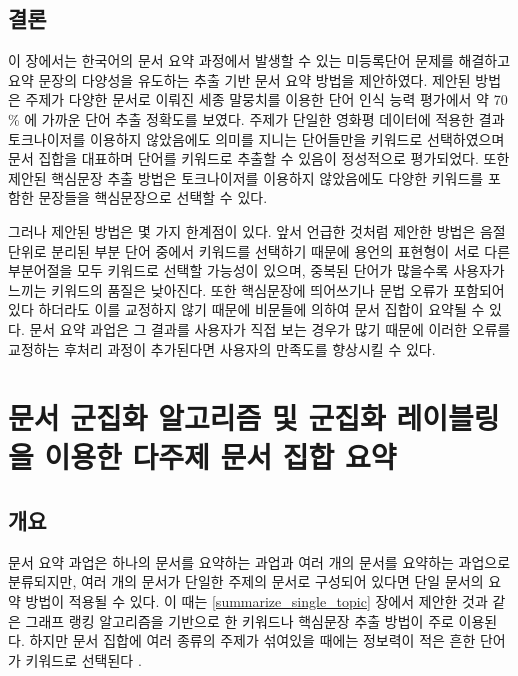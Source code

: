 \documentclass[oneside, ko,phd]{snuthesis_utf8_kor}
\begin{document}
\section{결론}

이 장에서는 한국어의 문서 요약 과정에서 발생할 수 있는 미등록단어 문제를 해결하고 요약 문장의 다양성을 유도하는 추출 기반 문서 요약 방법을 제안하였다.
제안된 방법은 주제가 다양한 문서로 이뤄진 세종 말뭉치를 이용한 단어 인식 능력 평가에서 약 70 \% 에 가까운 단어 추출 정확도를 보였다.
주제가 단일한 영화평 데이터에 적용한 결과 토크나이저를 이용하지 않았음에도 의미를 지니는 단어들만을 키워드로 선택하였으며 문서 집합을 대표하며 단어를 키워드로 추출할 수 있음이 정성적으로 평가되었다.
또한 제안된 핵심문장 추출 방법은 토크나이저를 이용하지 않았음에도 다양한 키워드를 포함한 문장들을 핵심문장으로 선택할 수 있다.

그러나 제안된 방법은 몇 가지 한계점이 있다.
앞서 언급한 것처럼 제안한 방법은 음절 단위로 분리된 부분 단어 중에서 키워드를 선택하기 때문에 용언의 표현형이 서로 다른 부분어절을 모두 키워드로 선택할 가능성이 있으며, 중복된 단어가 많을수록 사용자가 느끼는 키워드의 품질은 낮아진다.
또한 핵심문장에 띄어쓰기나 문법 오류가 포함되어 있다 하더라도 이를 교정하지 않기 때문에 비문들에 의하여 문서 집합이 요약될 수 있다.
문서 요약 과업은 그 결과를 사용자가 직접 보는 경우가 많기 때문에 이러한 오류를 교정하는 후처리 과정이 추가된다면 사용자의 만족도를 향상시킬 수 있다.

\newpage
\chapter{문서 군집화 알고리즘 및 군집화 레이블링을 이용한 다주제 문서 집합 요약} \label{improved_kmeans}

\section{개요}

문서 요약 과업은 하나의 문서를 요약하는 과업과 여러 개의 문서를 요약하는 과업으로 분류되지만, 여러 개의 문서가 단일한 주제의 문서로 구성되어 있다면 단일 문서의 요약 방법이 적용될 수 있다.
이 때는 \ref{summarize_single_topic} 장에서 제안한 것과 같은 그래프 랭킹 알고리즘을 기반으로 한 키워드나 핵심문장 추출 방법이 주로 이용된다.
하지만 문서 집합에 여러 종류의 주제가 섞여있을 때에는 정보력이 적은 흔한 단어가 키워드로 선택된다 \cite{goldstein2000multi, lin2002single, filippova2008sentence, filippova2010multi}.
\end{document}
